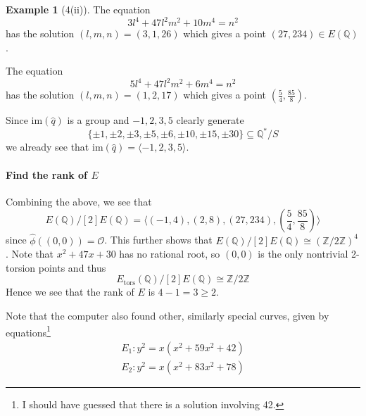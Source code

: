 \documentclass{scrartcl}
\newcommand{\Z}{\mathbb{Z}}
\newcommand{\Q}{\mathbb{Q}}
\newcommand{\im}{\mathrm{im}}
\renewcommand{\O}{\mathcal{O}}
\theoremstyle{definition}
\newtheorem{example}[subsection]{Example}
\begin{document}
\begin{example}[4(ii)]
    The equation
    \begin{equation*}
        3l^4 + 47 l^2 m^2 + 10 m^4 = n^2
    \end{equation*}
    has the solution $(l, m, n) = (3, 1, 26)$ which gives a point $(27, 234) \in E(\Q)$.

    The equation
    \begin{equation*}
        5l^4 + 47 l^2 m^2 + 6m^4 = n^2
    \end{equation*}
    has the solution $(l, m, n) = (1, 2, 17)$ which gives a point $(\frac 5 4, \frac {85} 8)$.

    Since $\im(\hat{q})$ is a group and $-1, 2, 3, 5$ clearly generate
    \begin{equation*}
        \{ \pm 1, \pm 2, \pm 3, \pm 5, \pm 6, \pm 10, \pm 15, \pm 30 \} \subseteq \Q^*/S
    \end{equation*}
    we already see that $\im(\hat{q}) = \langle -1, 2, 3, 5 \rangle$.

    \paragraph{Find the rank of $E$} Combining the above, we see that
    \begin{equation*}
        E(\Q)/[2]E(\Q) = \langle (-1, 4), (2, 8), (27, 234), \left(\frac 5 4, \frac {85} 8\right) \rangle
    \end{equation*}
    since $\hat{\phi}((0, 0)) = \O$.
    This further shows that $E(\Q)/[2]E(\Q) \cong (\Z/2\Z)^4$.
    Note that $x^2 + 47 x + 30$ has no rational root, so $(0, 0)$ is the only nontrivial 2-torsion points and thus
    \begin{equation*}
        E_{\mathrm{tors}}(\Q)/[2]E(\Q) \cong \Z/2\Z
    \end{equation*}
    Hence we see that the rank of $E$ is $4 - 1 = 3 \geq 2$.
\end{example}
Note that the computer also found other, similarly special curves, given by equations\footnote{I should have guessed that there is a solution involving 42.}
\begin{align*}
    E_1: y^2 = x(x^2 + 59 x^2 + 42) \\
    E_2: y^2 = x(x^2 + 83 x^2 + 78)
\end{align*}
\end{document}

